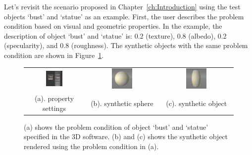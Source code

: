 Let's revisit the scenario proposed in Chapter~\ref{ch:Introduction} using the test objects `bust' and `statue' as an example. First, the user describes the problem condition based on visual and geometric properties. In the example, the description of object `bust' and `statue' is: 0.2 (texture), 0.8 (albedo), 0.2 (specularity), and 0.8 (roughness). The synthetic objects with the same problem condition are shown in Figure~\ref{fig:desc_interp_1}.
\begin{figure}[!htbp]
\centering
\begin{tabular}{ccc}
\includegraphics[width=0.3\textwidth]{img/interp/ui/interp_desc_0.JPG} &
\includegraphics[width=0.3\textwidth]{img/interp/ui/interp_desc_1.png} &
\includegraphics[width=0.3\textwidth]{img/interp/ui/interp_desc_2.png} \\
(a). property settings & (b). synthetic sphere & (c). synthetic object \\
\end{tabular}
\caption{(a) shows the problem condition of object `bust' and `statue' specified in the 3D software. (b) and (c) shows the synthetic object rendered using the problem condition in (a).}
\label{fig:desc_interp_1}
\end{figure}


